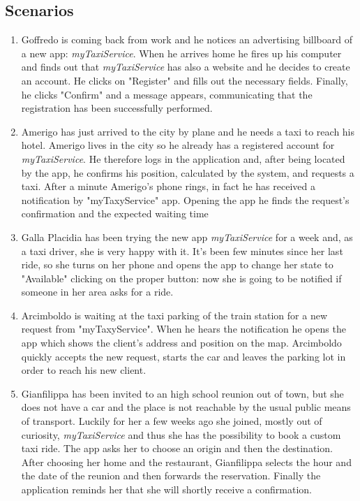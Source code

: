 \documentclass[a4paper]{article}
\begin{document}
\begin{enumerate}[label=\bfseries G\arabic*:]
\subsection{Scenarios}
    \begin{enumerate}[label=\bfseries S\arabic*:]
        \item Goffredo is coming back from work and he notices an advertising billboard of a new app: \emph{myTaxiService}. When he arrives home he fires up his computer and finds out that \emph{myTaxiService} has also a website and he decides to create an account. He clicks on "Register" and fills out the necessary fields. Finally, he clicks "Confirm" and a message appears, communicating that the registration has been successfully performed.
        \item Amerigo has just arrived to the city by plane and he needs a taxi to reach his hotel. Amerigo lives in the city so he already has a registered account for \emph{myTaxiService}. He therefore logs in the application and, after being located by the app, he confirms his position, calculated by the system, and requests a taxi. After a minute Amerigo's phone rings, in fact he has received a notification by "myTaxyService" app. Opening the app he finds the request's confirmation and the expected waiting time
        \item Galla Placidia has been trying the new app \emph{myTaxiService} for a week and, as a taxi driver, she is very happy with it. It's been few minutes since her last ride, so she turns on her phone and opens the app to change her state to "Available" clicking on the proper button: now she is going to be notified if someone in her area asks for a ride.
        \item Arcimboldo is waiting at the taxi parking of the train station for a new request from "myTaxyService". When he hears the notification he opens the app which shows the client's address and position on the map. Arcimboldo quickly accepts the new request, starts the car and leaves the parking lot in order to reach his new client. 
        \item Gianfilippa has been invited to an high school reunion out of town, but she does not have a car and the place is not reachable by the usual public means of transport. Luckily for her a few weeks ago she joined, mostly out of curiosity, \emph{myTaxiService} and thus she has the possibility to book a custom taxi ride. The app asks her to choose an origin and then the destination. After choosing her home and the restaurant, Gianfilippa selects the hour and the date of the reunion and then forwards the reservation. Finally the application reminds her that she will shortly receive a confirmation.
    \end{enumerate}
    

\end{enumerate}
\end{document}
